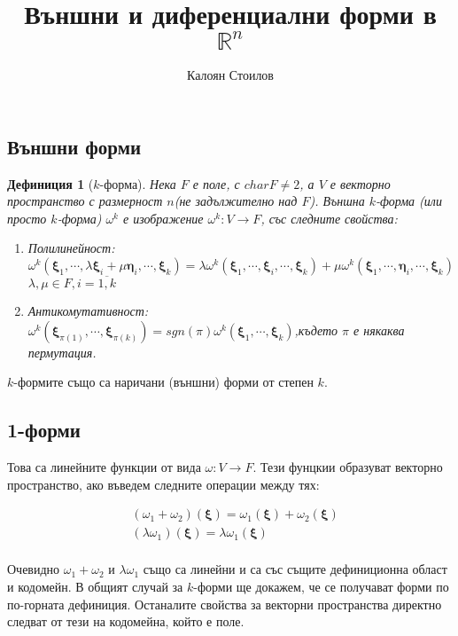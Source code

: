 \documentclass[12pt]{article}
\title{Външни и диференциални форми в $\mathbb{R}^n$}
\author{Калоян Стоилов}
\newtheorem{definition}{Дефиниция}[section]
\newcommand\func[3]{#1:#2 \to #3}
\newcommand\nstfunc[1]{\func{#1}{V}{F}}
\newcommand\myxi[0]{\boldsymbol{\xi}}
\newcommand\myeta[0]{\boldsymbol{\eta}}
\begin{document}
\maketitle
\begin{large}
\tableofcontents{}


\section{Външни форми}
\begin{definition}[$k$-форма] Нека $F$ е поле, с $char F \neq 2$, а $V$ е векторно пространство с размерност $n$(не задължително над $F$). Външна $k$-форма (или просто $k$-форма) $\omega^k$ е изображение $\func{\omega^k}{V}{F}$, със следните свойства:
\begin{enumerate}
\item Полилинейност: \\ 
$\omega^k(\myxi_1,\cdots,\lambda\myxi_i+\mu\myeta_i,\cdots,\myxi_k)=\lambda\omega^k(\myxi_1,\cdots,\myxi_i,\cdots,\myxi_k)+\mu\omega^k(\myxi_1,\cdots,\myeta_i,\cdots,\myxi_k)$ \\
$\lambda,\mu \in F, i=\overline{1,k}$
\item Антикомутативност: \\
$\omega^k(\myxi_{\pi(1)},\cdots,\myxi_{\pi(k)})=sgn(\pi)\omega^k(\myxi_1,\cdots,\myxi_k)$,където $\pi$ е някаква пермутация.
\end{enumerate}
\end{definition}

$k$-формите също са наричани (външни) форми от степен $k$.


\subsection{1-форми}

Това са линейните функции от вида $\nstfunc{\omega}$.
Тези фунцкии образуват векторно пространство, ако въведем следните операции между тях:

\begin{align*}
&(\omega_1+\omega_2)(\myxi)=\omega_1(\myxi)+\omega_2(\myxi) \\
&(\lambda\omega_1)(\myxi)=\lambda\omega_1(\myxi) \\
\end{align*}

Очевидно $\omega_1+\omega_2$ и $\lambda\omega_1$ също са линейни и са със същите дефиниционна област и кодомейн. В общият случай за $k$-форми ще докажем, че се получават форми по по-горната дефиниция. Останалите свойства за векторни пространства директно следват от тези на кодомейна, който е поле.\\


\end{large}
\end{document}
